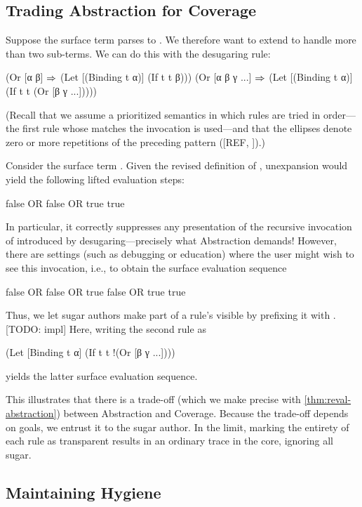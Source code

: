 \subsection{Trading Abstraction for Coverage}
\label{sec:reval-trading}

Suppose the surface term  parses to
. We therefore want to extend 
to handle more than two sub-terms.  We can do this with the desugaring
rule:
\begin{Codes}
(Or [α β] \(\Rightarrow\)
  (Let [(Binding t α)]
      (If t t β)))
(Or [α β γ ...] \(\Rightarrow\)
  (Let [(Binding t α)]
      (If t t (Or [β γ ...]))))
\end{Codes}
(Recall that we assume a prioritized semantics in which rules are tried in
order---the first rule whose  matches the invocation is
used---and that the ellipses denote zero or more repetitions
of the preceding pattern ([REF, \cite{macro-by-example}]).)

Consider the surface term . 
Given the revised definition of , unexpansion would yield the
following lifted evaluation steps:
\begin{Codes}
    false OR false OR true
\SurfStep true
\end{Codes}
In particular, it correctly suppresses any presentation of the recursive
invocation of 
introduced by desugaring---precisely what Abstraction demands!
However, there are settings
(such as debugging or education) where the user might wish to see this
invocation, i.e., to obtain the surface evaluation sequence
\begin{Codes}
    false OR false OR true
\SurfStep false OR true
\SurfStep true
\end{Codes}
Thus, we let sugar authors make part of a rule's 
visible by prefixing it with \Code{!}. [TODO: impl] Here, writing the second
 rule as
\begin{Codes}
(Let [Binding t α]
    (If t t !(Or [β γ ...])))
\end{Codes}
yields the latter surface evaluation sequence.

This illustrates that there is a trade-off (which we make precise with
\cref{thm:reval-abstraction}) between Abstraction and Coverage.
Because the trade-off depends on
goals, we entrust it to the sugar author.  In the limit,
marking the entirety of each rule as transparent results in
an ordinary trace in the core, ignoring all sugar.

\subsection{Maintaining Hygiene}

